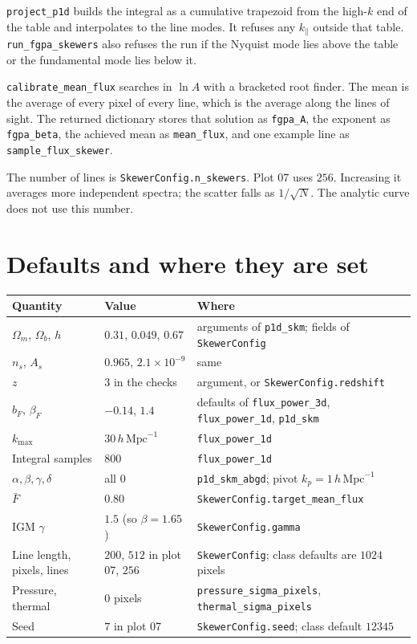 \documentclass[11pt]{article}
\begin{document}
\noindent
\texttt{project\_p1d} builds the integral as a cumulative trapezoid from the high-$k$ end of the table and interpolates to the line modes. It refuses any $k_\parallel$ outside that table. \texttt{run\_fgpa\_skewers} also refuses the run if the Nyquist mode lies above the table or the fundamental mode lies below it.

\texttt{calibrate\_mean\_flux} searches in $\ln A$ with a bracketed root finder. The mean is the average of every pixel of every line, which is the average along the lines of sight. The returned dictionary stores that solution as \texttt{fgpa\_A}, the exponent as \texttt{fgpa\_beta}, the achieved mean as \texttt{mean\_flux}, and one example line as \texttt{sample\_flux\_skewer}.

The number of lines is \texttt{SkewerConfig.n\_skewers}. Plot 07 uses $256$. Increasing it averages more independent spectra; the scatter falls as $1/\sqrt{N}$. The analytic curve does not use this number.

\section{Defaults and where they are set}

\begin{center}
\small
\begin{tabular}{@{}llp{}@{}}
\toprule
Quantity & Value & Where \\
\midrule
$\Omega_m$, $\Omega_b$, $h$ & $0.31$, $0.049$, $0.67$ & arguments of \texttt{p1d\_skm}; fields of \texttt{SkewerConfig} \\
$n_s$, $A_s$ & $0.965$, $2.1\times 10^{-9}$ & same \\
$z$ & $3$ in the checks & argument, or \texttt{SkewerConfig.redshift} \\
$b_F$, $\beta_F$ & $-0.14$, $1.4$ & defaults of \texttt{flux\_power\_3d}, \texttt{flux\_power\_1d}, \texttt{p1d\_skm} \\
$k_\mathrm{max}$ & $30\,h\,\mathrm{Mpc}^{-1}$ & \texttt{flux\_power\_1d} \\
Integral samples & $800$ & \texttt{flux\_power\_1d} \\
$\alpha,\beta,\gamma,\delta$ & all $0$ & \texttt{p1d\_skm\_abgd}; pivot $k_p=1\,h\,\mathrm{Mpc}^{-1}$ \\
$\bar F$ & $0.80$ & \texttt{SkewerConfig.target\_mean\_flux} \\
IGM $\gamma$ & $1.5$ (so $\beta=1.65$) & \texttt{SkewerConfig.gamma} \\
Line length, pixels, lines & $200$, $512$ in plot 07, $256$ & \texttt{SkewerConfig}; class defaults are $1024$ pixels \\
Pressure, thermal & $0$ pixels & \texttt{pressure\_sigma\_pixels}, \texttt{thermal\_sigma\_pixels} \\
Seed & $7$ in plot 07 & \texttt{SkewerConfig.seed}; class default $12345$ \\
\bottomrule
\end{tabular}
\end{center}
\end{document}
